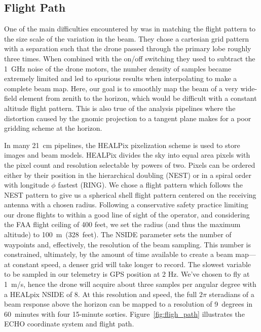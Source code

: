 \documentclass[preprint2,numberedappendix,tighten,twocolappendix]{aastex6}
\begin{document}
\subsection{Flight Path}

One of the main difficulties encountered by \citet{2015PASP..127.1131C} was in matching the flight pattern to the size scale of the variation in the beam.  They chose a cartesian grid pattern with a separation such that the drone passed through the primary lobe roughly three times.  When combined with the on/off switching they used to subtract the 1~GHz noise of the drone motors, the number density of samples became extremely limited and led to spurious results when interpolating to make a complete beam map.  Here, our goal is to smoothly map the beam of a very wide-field element from zenith to the horizon, which would be difficult with a constant altitude flight pattern.  This is also true of the analysis pipelines where the distortion caused by the gnomic projection to a tangent plane makes for a poor gridding scheme at the horizon. 

In many 21~cm pipelines, the HEALPix pixelization scheme \citep{Gorski:2005p7667} is used to store images and beam models.  HEALPix divides the sky into equal area pixels with the pixel count and resolution selectable by powers of two. Pixels can be ordered either by their position in the hierarchical doubling (NEST) or in a spiral order with  longitude $\phi$ fastest (RING).  We chose a flight pattern which follows the NEST pattern to give us a spherical shell flight pattern centered on the receiving antenna with a chosen radius. Following a conservative safety practice limiting our drone flights to within a good line of sight of the operator, and considering the FAA flight ceiling of 400 feet, we set the radius (and thus the maximum altitude) to 100~m~(328~feet). The NSIDE parameter sets the number of waypoints and, effectively, the resolution of the beam sampling.  This number is constrained, ultimately, by the amount of time available to create a beam map---at constant speed, a denser grid will take longer to record.  The slowest variable to be sampled in our telemetry is GPS position at 2 Hz. We've chosen to fly at 1~m/s, hence the drone will acquire about three samples per angular degree with a HEALpix NSIDE of 8.  At this resolution and speed, the full $2\pi$ steradians of a beam response above the horizon can be mapped to a resolution of 9~degrees in 60~minutes with four 15-minute sorties.  Figure~\ref{fig:fligh_path} illustrates the ECHO coordinate system and flight path.
\end{document}
